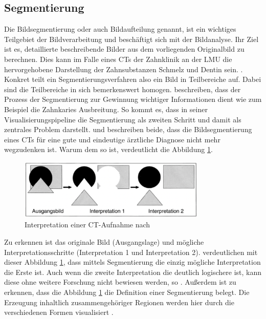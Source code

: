 \subsection{Segmentierung}
\label{subsec:segmentierung} Die Bildsegmentierung oder auch Bildaufteilung genannt,
ist ein wichtiges Teilgebiet der Bildverarbeitung und beschäftigt sich mit der
Bildanalyse. Ihr Ziel ist es, detaillierte beschreibende Bilder aus dem
vorliegenden Originalbild zu berechnen. Dies kann im Falle eines \ac{CT}s der Zahnklinik
an der \ac{LMU} die hervorgehobene Darstellung der Zahnsubstanzen Schmelz und
Dentin sein. \citep[vgl.][S.~359]{lehmann2013bildverarbeitung}. Konkret teilt ein
Segmentierungsverfahren also ein Bild in Teilbereiche auf. Dabei sind die
Teilbereiche in sich bemerkenswert homogen. \citet[S.~1]{ramesh2021} beschreiben,
dass der Prozess der Segmentierung zur Gewinnung wichtiger Informationen dient wie
zum Beispiel die Zahnkaries Ausbreitung. So kommt es, dass \citet[S.~50]{handels2000}
in seiner Visualisierungspipeline die Segmentierung als zweiten Schritt und
damit als zentrales Problem darstellt. \citet[S.~95]{handels2000} und \citet[S.~360]{lehmann2013bildverarbeitung}
beschreiben beide, dass die Bildsegmentierung eines \ac{CT}s für eine gute und
eindeutige ärztliche Diagnose nicht mehr wegzudenken ist. Warum dem so ist,
verdeutlicht die Abbildung \ref{fig:interpretation_einer_ct_aufnahem}.

\begin{figure}[h]
	\centering
	\includegraphics[width=0.8\textwidth]{img/bild_interpretation.jpg}
	\caption{Interpretation einer CT-Aufnahme nach \citet[S.~360]{lehmann2013bildverarbeitung}}
	\label{fig:interpretation_einer_ct_aufnahem}
\end{figure}

Zu erkennen ist das originale Bild (Ausgangslage) und mögliche Interpretationsschritte
(Interpretation 1 und Interpretation 2). \citet[S.~360]{lehmann2013bildverarbeitung}
verdeutlichen mit dieser Abbildung \ref{fig:interpretation_einer_ct_aufnahem},
dass mittels Segmentierung die einzig mögliche Interpretation die Erste ist. Auch
wenn die zweite Interpretation die deutlich logischere ist, kann diese ohne
weitere Forschung nicht bewiesen werden, so \citet[S.~360]{lehmann2013bildverarbeitung}.
Außerdem ist zu erkennen, dass die Abbildung
\ref{fig:interpretation_einer_ct_aufnahem} die Definition einer Segmentierung
belegt. Die Erzeugung inhaltlich zusammengehöriger Regionen werden hier durch die
verschiedenen Formen visualisiert \citep[vgl.][S.~360]{lehmann2013bildverarbeitung}.

